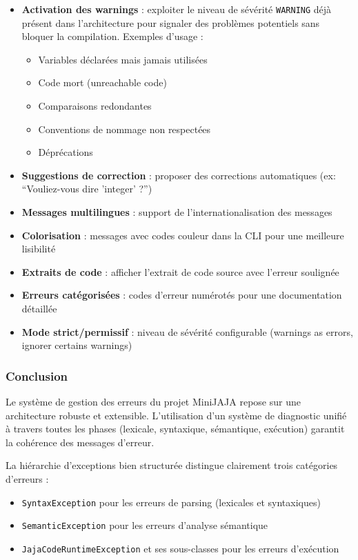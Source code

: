 \begin{itemize}
    \item \textbf{Activation des warnings} : exploiter le niveau de sévérité \texttt{WARNING} déjà présent dans l'architecture pour signaler des problèmes potentiels sans bloquer la compilation. Exemples d'usage :
    \begin{itemize}
        \item Variables déclarées mais jamais utilisées
        \item Code mort (unreachable code)
        \item Comparaisons redondantes
        \item Conventions de nommage non respectées
        \item Déprécations
    \end{itemize}
    \item \textbf{Suggestions de correction} : proposer des corrections automatiques (ex: ``Vouliez-vous dire 'integer' ?'')
    \item \textbf{Messages multilingues} : support de l'internationalisation des messages
    \item \textbf{Colorisation} : messages avec codes couleur dans la CLI pour une meilleure lisibilité
    \item \textbf{Extraits de code} : afficher l'extrait de code source avec l'erreur soulignée
    \item \textbf{Erreurs catégorisées} : codes d'erreur numérotés pour une documentation détaillée
    \item \textbf{Mode strict/permissif} : niveau de sévérité configurable (warnings as errors, ignorer certains warnings)
\end{itemize}

\subsubsection{Conclusion}\label{subsec:conclusion}

Le système de gestion des erreurs du projet MiniJAJA repose sur une architecture robuste et extensible.
L'utilisation d'un système de diagnostic unifié à travers toutes les phases (lexicale, syntaxique, sémantique, exécution) garantit la cohérence des messages d'erreur.

La hiérarchie d'exceptions bien structurée distingue clairement trois catégories d'erreurs :
\begin{itemize}
    \item \texttt{SyntaxException} pour les erreurs de parsing (lexicales et syntaxiques)
    \item \texttt{SemanticException} pour les erreurs d'analyse sémantique
    \item \texttt{JajaCodeRuntimeException} et ses sous-classes pour les erreurs d'exécution
\end{itemize}


